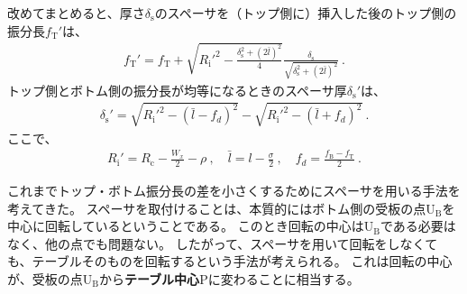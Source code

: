 \begin{hosoku}
改めてまとめると、厚さ$\delta_\mathrm s$のスペーサを（トップ側に）挿入した後のトップ側の振分長$f_\mathrm T'$は、
\begin{align*}
  f_\mathrm T'
  = f_\mathrm T+\sqrt{R_\mathrm i'^2-\frac{\delta_\mathrm s^2+(2\bar l)^2}4}\frac{\delta_\mathrm s}{\sqrt{\delta_\mathrm s^2+(2\bar l)^2}}\ .
\end{align*}
トップ側とボトム側の振分長が均等になるときのスペーサ厚$\delta_\mathrm s'$は、
\begin{align*}
  \delta_\mathrm s' = \sqrt{R_\mathrm i'^2-(\bar l-f_d)^2}-\sqrt{R_\mathrm i'^2-(\bar l+f_d)^2}\ .
\end{align*}
ここで、
\begin{align*}
  R_\mathrm i' = R_\mathrm c-\frac{W_x}2-\rho\ ,\quad
  \bar l = l-\frac\sigma2\ ,\quad
  f_d = \frac{f_\mathrm B-f_\mathrm T}2\ .
\end{align*}
\end{hosoku}



\clearpage
これまでトップ・ボトム振分長の差を小さくするためにスペーサを用いる手法を考えてきた。
スペーサを取付けることは、本質的にはボトム側の受板の点U$_\mathrm B$を中心に回転しているということである。
このとき回転の中心はU$_\mathrm B$である必要はなく、他の点でも問題ない。
したがって、スペーサを用いて回転をしなくても、テーブルそのものを回転するという手法が考えられる。
これは回転の中心が、受板の点U$_\mathrm B$から\textbf{テーブル中心}Pに変わることに相当する。

